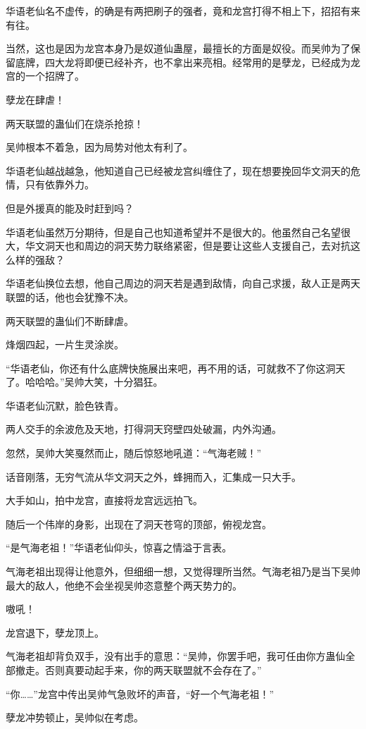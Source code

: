 \begin{this_body}
华语老仙名不虚传，的确是有两把刷子的强者，竟和龙宫打得不相上下，招招有来有往。

当然，这也是因为龙宫本身乃是奴道仙蛊屋，最擅长的方面是奴役。而吴帅为了保留底牌，四大龙将即便已经补齐，也不拿出来亮相。经常用的是孽龙，已经成为龙宫的一个招牌了。

孽龙在肆虐！

两天联盟的蛊仙们在烧杀抢掠！

吴帅根本不着急，因为局势对他太有利了。

华语老仙越战越急，他知道自己已经被龙宫纠缠住了，现在想要挽回华文洞天的危情，只有依靠外力。

但是外援真的能及时赶到吗？

华语老仙虽然万分期待，但是自己也知道希望并不是很大的。他虽然自己名望很大，华文洞天也和周边的洞天势力联络紧密，但是要让这些人支援自己，去对抗这么样的强敌？

华语老仙换位去想，他自己周边的洞天若是遇到敌情，向自己求援，敌人正是两天联盟的话，他也会犹豫不决。

两天联盟的蛊仙们不断肆虐。

烽烟四起，一片生灵涂炭。

“华语老仙，你还有什么底牌快施展出来吧，再不用的话，可就救不了你这洞天了。哈哈哈。”吴帅大笑，十分猖狂。

华语老仙沉默，脸色铁青。

两人交手的余波危及天地，打得洞天窍壁四处破漏，内外沟通。

忽然，吴帅大笑戛然而止，随后惊怒地吼道：“气海老贼！”

话音刚落，无穷气流从华文洞天之外，蜂拥而入，汇集成一只大手。

大手如山，拍中龙宫，直接将龙宫远远拍飞。

随后一个伟岸的身影，出现在了洞天苍穹的顶部，俯视龙宫。

“是气海老祖！”华语老仙仰头，惊喜之情溢于言表。

气海老祖出现得让他意外，但细细一想，又觉得理所当然。气海老祖乃是当下吴帅最大的敌人，他绝不会坐视吴帅恣意整个两天势力的。

嗷吼！

龙宫退下，孽龙顶上。

气海老祖却背负双手，没有出手的意思：“吴帅，你罢手吧，我可任由你方蛊仙全部撤走。否则真要动起手来，你的两天联盟就不会存在了。”

“你……”龙宫中传出吴帅气急败坏的声音，“好一个气海老祖！”

孽龙冲势顿止，吴帅似在考虑。


\end{this_body}
